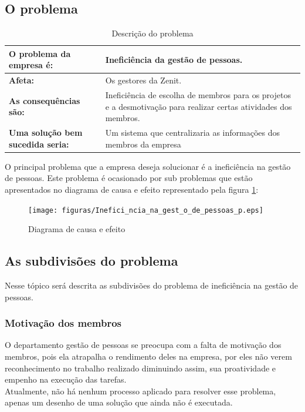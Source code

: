 \begin{anexosenv}
\section[O problema]{O problema}

\begin{table}[H]
    \centering
    \label{descricaodoprobelma}
    \caption{Descrição do problema}
    \begin{tabular}{|l|p{10cm}|}
        \hline
        \textbf{O problema da empresa é:} & Ineficiência da gestão de pessoas.\\
        \hline
        \textbf{Afeta:} & Os gestores da Zenit.\\
        \hline
        \textbf{As consequências são:} & Ineficiência de escolha de membros para os projetos e a desmotivação para realizar certas atividades dos membros.\\
        \hline
        \textbf{Uma solução bem sucedida seria:} & Um sistema que centralizaria as informações dos membros da empresa\\
        \hline
    \end{tabular}
\end{table}


O principal problema que a empresa deseja solucionar é a ineficiência na gestão de pessoas. Este problema é ocasionado por sub problemas que estão apresentados no diagrama de causa e efeito representado pela figura \ref{causaEfeito}:\\

\begin{figure}
    \centering
    \texttt{[image: figuras/Inefici\_ncia\_na\_gest\_o\_de\_pessoas\_p.eps]}
    \caption{Diagrama de causa e efeito\label{causaEfeito}}
\end{figure}

\subsection[As subdivisões do problema]{As subdivisões do problema}


Nesse tópico será descrita as subdivisões do problema de ineficiência na gestão de pessoas.\\

\subsubsection[Motivação dos membros]{Motivação dos membros}

O departamento gestão de pessoas se preocupa com a falta de motivação dos membros, pois ela atrapalha o rendimento deles na empresa, por eles não verem reconhecimento no trabalho realizado diminuindo assim, sua proatividade e empenho na execução das tarefas.\\
Atualmente, não há nenhum processo aplicado para resolver esse problema, apenas um desenho de uma solução que ainda não é executada.\\


\end{anexosenv}
